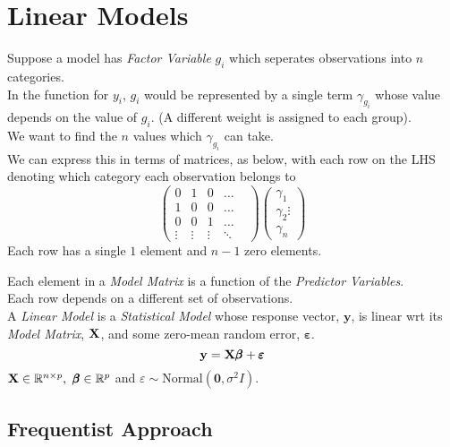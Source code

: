\documentclass[11pt,a4paper]{article}
\begin{document}
\section{Linear Models}

Suppose a model has \textit{Factor Variable} $g_i$ which seperates observations into $n$ categories.\\
In the function for $y_i$, $g_i$ would be represented by a single term $\gamma_{g_i}$ whose value depends on the value of $g_i$. (\ie A different weight is assigned to each group). \\
We want to find the $n$ values which $\gamma_{g_i}$ can take.\\
We can express this in terms of matrices, as below, with each row on the LHS denoting which category each observation belongs to
$$\begin{pmatrix}0&1&0&\dots&\\1&0&0&\dots\\0&0&1&\dots\\\vdots&\vdots&\vdots&\ddots\end{pmatrix}\begin{pmatrix}\gamma_1\\\gamma_2\vdots\\\gamma_n\end{pmatrix}$$
\nb Each row has a single $1$ element and $n-1$ zero elements.\\


Each element in a \textit{Model Matrix} is a function of the \textit{Predictor Variables}.\\
Each row depends on a different set of observations.\\

A \textit{Linear Model} is a \textit{Statistical Model} whose response vector, $\textbf{y}$, is linear wrt its \textit{Model Matrix}, $\textbf{X}$, and some zero-mean random error, $\pmb\varepsilon$.
$$\textbf{y}=\textbf{X}\pmb\beta+\pmb\varepsilon$$
$\X\in\reals^{n\times p},\ \pmb\beta\in\reals^p$ and $\varepsilon\sim\text{Normal}(\pmb0,\sigma^2 I)$.

\subsection{Frequentist Approach}
\end{document}
